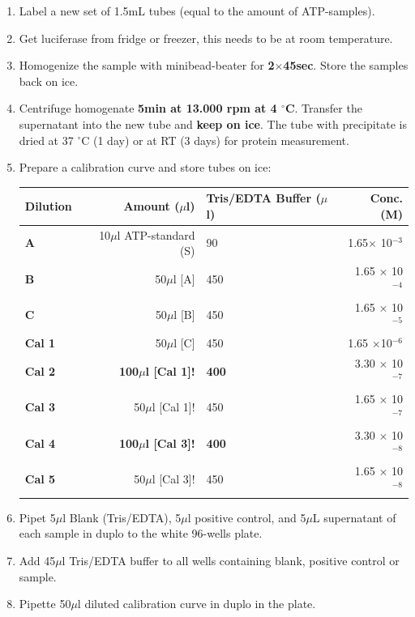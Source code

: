 \documentclass{EU-report}
\begin{document}
\begin{itemize}
\begin{enumerate}
\item Label a new set of 1.5mL tubes (equal to the amount of ATP-samples).
\item Get luciferase from fridge or freezer, this needs to be at room temperature.
\item Homogenize the sample with minibead-beater for \textbf{2$\times$45sec}. Store the samples back on ice.
\item Centrifuge homogenate \textbf{5min at 13.000 rpm at 4 $^{\circ}$C}. Transfer the supernatant into the new tube and \textbf{keep on ice}. The tube with precipitate is dried at 37 $^{\circ}$C (1 day) or at RT (3 days) for protein measurement.
\item Prepare a calibration curve and store tubes on ice:
\begin{center}
	\begin{tabular}{lrp{7cm}r} \hline\hline
\textbf{Dilution} & \textbf{Amount ($\mu$l)} 	 & \textbf{ Tris/EDTA Buffer ($\mu$l)} & \textbf{ Conc. (M)} \\
\hline
 \textbf{A}	 	& 10$\mu$l ATP-standard (S)	& 90							& 1.65$\times$ 10$^{-3}$\\
 \hline
 \textbf{B}	 	& 50$\mu$l [A]				 & 450						& 1.65 $\times$ 10$^{-4}$\\
 \hline
 \textbf{C}	 	& 50$\mu$l [B]			 	& 450						& 1.65 $\times$ 10$^{-5}$\\
 \hline
 \textbf{Cal 1}	&  50$\mu$l [C]			   	& 450						& 1.65 $\times$10$^{-6}$\\
 \hline
 \textbf{Cal 2}	& \textbf{100\boldmath$\mu$l [Cal 1]!}	& \textbf{400}					& 3.30 $\times$ 10$^{-7}$\\
 \hline
 \textbf{Cal 3}	& 50$\mu$l [Cal 1]!	 	  	& 450						& 1.65 $\times$ 10$^{-7}$\\
 \hline
 \textbf{Cal 4}	& \textbf{100\boldmath$\mu$l [Cal 3]!}	& \textbf{400}					& 3.30 $\times$ 10$^{-8}$\\
 \hline
 \textbf{Cal 5}	& 50$\mu$l [Cal 3]!			& 450						& 1.65 $\times$ 10$^{-8}$\\
\hline
	\end{tabular}
\end{center}
\item Pipet 5$\mu$l Blank (Tris/EDTA), 5$\mu$l positive control, and 5$\mu$L supernatant of each sample in duplo to the white 96-wells plate.
\item Add 45$\mu$l Tris/EDTA buffer to all wells containing blank, positive control or sample. 
\item Pipette 50$\mu$l diluted calibration curve in duplo in the plate.

\end{enumerate}
\end{itemize}
\end{document}
